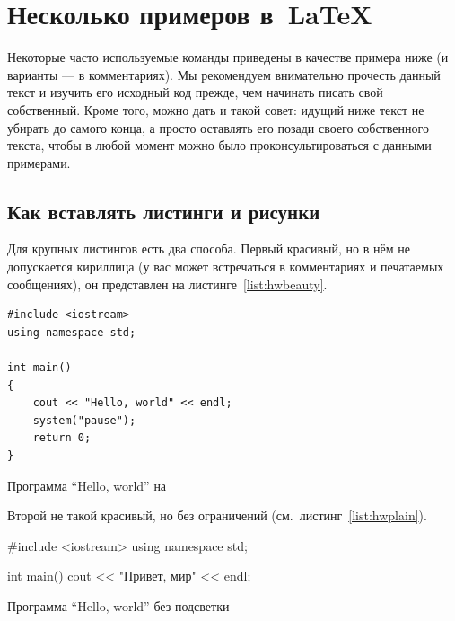 \section{Несколько примеров в~\LaTeX{}}
\label{sec:examples}

Некоторые часто используемые
команды приведены в качестве примера ниже (и варианты — в
комментариях). Мы рекомендуем внимательно прочесть данный
текст и изучить его исходный код прежде, чем начинать писать
свой собственный. Кроме того, можно дать и такой совет: идущий
ниже текст не убирать до самого конца, а просто оставлять его
позади своего собственного текста, чтобы в любой момент можно
было проконсультироваться с данными примерами.

\subsection{Как вставлять листинги и рисунки}

Для крупных листингов есть два способа. Первый красивый, но в нём не допускается
кириллица (у вас может встречаться в комментариях и
печатаемых сообщениях), он представлен на листинге~\ref{list:hwbeauty}.
\begin{ListingEnv}[H]%
\begin{lstlisting}
#include <iostream>
using namespace std;

int main()
{
    cout << "Hello, world" << endl;
    system("pause");
    return 0;
}
\end{lstlisting}
\caption{Программа “Hello, world” на \protect\cpp}
\label{list:hwbeauty}
\end{ListingEnv}

Второй не такой красивый, но без ограничений (см.~листинг~\ref{list:hwplain}).
\begin{ListingEnv}[H]
\begin{Verb}

#include <iostream>
using namespace std;

int main()
{
    cout << "Привет, мир" << endl;
}
\end{Verb}
\caption{Программа “Hello, world” без подсветки}
\label{list:hwplain}
\end{ListingEnv}

